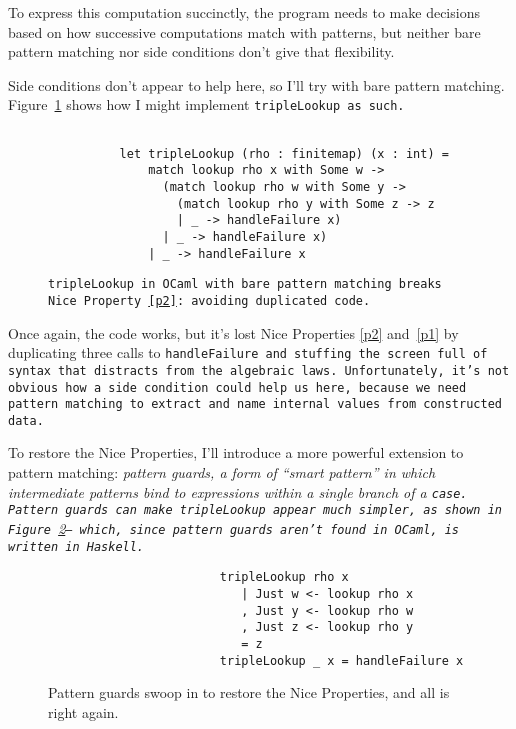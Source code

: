 \documentclass[manuscript,screen,review, 12pt, nonacm]{acmart}
\begin{document}
    To express this computation succinctly, the program needs to make decisions
    based on how successive computations match with patterns, but neither bare
    pattern matching nor side conditions don't give that flexibility. 
    
    Side conditions don't appear to help here, so I'll try with bare pattern
    matching. Figure~\ref{fig:pmtriplelookup} shows how I might implement
    \tt{tripleLookup} as such. 

    \begin{figure}[ht]
        \begin{verbatim}

          let tripleLookup (rho : finitemap) (x : int) =
              match lookup rho x with Some w -> 
                (match lookup rho w with Some y -> 
                  (match lookup rho y with Some z -> z
                  | _ -> handleFailure x)
                | _ -> handleFailure x)
              | _ -> handleFailure x
            \end{verbatim}
        \caption{\tt{tripleLookup} in OCaml with bare pattern matching breaks
                    Nice Property~\ref{p2}: avoiding duplicated code. } 
                    
        \label{fig:pmtriplelookup}
    \end{figure}

    Once again, the code works, but it's lost Nice Properties \ref{p2}
    and~\ref{p1} by duplicating three calls to \tt{handleFailure} and stuffing
    the screen full of syntax that distracts from the algebraic laws.
    Unfortunately, it's not obvious how a side condition could help us here,
    because we need pattern matching to extract and name internal values from
    constructed data.

    To restore the Nice Properties, I'll introduce a more powerful extension to
    pattern matching: \it{pattern guards}, a form of “smart pattern” in which
    intermediate patterns bind to expressions within a single branch of a
    \tt{case}. Pattern guards can make \tt{tripleLookup} appear \it{much}
    simpler, as shown in Figure~\ref{fig:guardtriplelookup}--- which, since
    pattern guards aren't found in OCaml, is written in Haskell.

    \begin{figure}
        \begin{center}
        \begin{verbatim}
                        tripleLookup rho x
                           | Just w <- lookup rho x
                           , Just y <- lookup rho w
                           , Just z <- lookup rho y
                           = z
                        tripleLookup _ x = handleFailure x
        \end{verbatim}
        \end{center}    
    \caption{Pattern guards swoop in to restore the Nice Properties, and all is
    right again.} 
    \label{fig:guardtriplelookup}
    \end{figure}
\end{document}
